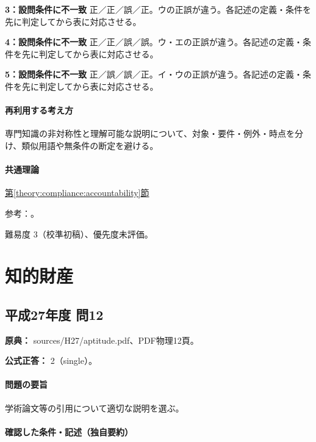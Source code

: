 \noindent\textbf{3：設問条件に不一致} 正／正／誤／正。ウの正誤が違う。各記述の定義・条件を先に判定してから表に対応させる。\par

\noindent\textbf{4：設問条件に不一致} 正／正／誤／誤。ウ・エの正誤が違う。各記述の定義・条件を先に判定してから表に対応させる。\par

\noindent\textbf{5：設問条件に不一致} 正／誤／誤／正。イ・ウの正誤が違う。各記述の定義・条件を先に判定してから表に対応させる。\par

\paragraph{再利用する考え方} 専門知識の非対称性と理解可能な説明について、対象・要件・例外・時点を分け、類似用語や無条件の断定を避ける。

\paragraph{共通理論} \hyperref[theory:compliance:accountability]{第\ref*{theory:compliance:accountability}節}

\par 参考：\cite{ipej_ethics2011,ieej_conduct2007}。

\par 難易度 3（校準初稿）、優先度未評価。

\section{知的財産}

\subsection{平成27年度 問12}
\label{q:h27-reg-apt-12}

\noindent\textbf{原典：} sources/H27/aptitude.pdf、PDF物理12頁。

\textbf{公式正答：} 2（single）。

\paragraph{問題の要旨} 学術論文等の引用について適切な説明を選ぶ。

\paragraph{確認した条件・記述（独自要約）}\mbox{}\par

